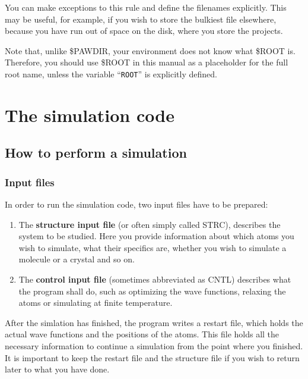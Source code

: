 \documentclass[final,12pt]{article}
\begin{document}
You can make exceptions to this rule and define the filenames
explicitly. This may be useful, for example, if you wish to store the
bulkiest file elsewhere, because you have run out of space on the
disk, where you store the projects.

Note that, unlike \$PAWDIR, your environment does not know what \$ROOT
is. Therefore, you should use \$ROOT in this manual as a placeholder for
the full root name, unless the variable ``{\tt ROOT}'' is
explicitly defined. 

\section{The simulation code}

\subsection{How to perform a simulation}

\subsubsection{Input files}

In order to run the simulation code, two input files have to be
prepared:

\begin{enumerate}
\item The \textbf{structure input file} (or often simply called STRC),
  describes the system to be studied. Here you provide information
  about which atoms you wish to simulate, what their specifics are,
  whether you wish to simulate a molecule or a crystal and so on.
\item The \textbf{control input file} (sometimes abbreviated as CNTL)
  describes what the program shall do, such as optimizing the wave
  functions, relaxing the atoms or simulating at finite temperature.
\end{enumerate}

After the simlation has finished, the program writes a restart file, which
holds the actual wave functions and the positions of the atoms. This
file holds all the necessary information to continue a simulation from
the point where you finished.  It is important to keep the restart file
and the structure file if you wish to return later to what you have
done. 
\end{document}
